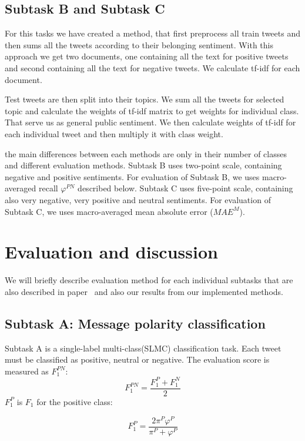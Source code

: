 \documentclass[runningheads,a4paper]{llncs}
\begin{document}
\subsection{Subtask B and Subtask C}
For this tasks we have created a method, that first preprocess all train tweets and then sums all the tweets according to their belonging sentiment. With this approach we get two documents, one containing all the text for positive tweets and second containing all the text for negative tweets. We calculate tf-idf for each document. 

Test tweets are then split into their topics. We sum all the tweets for selected topic and calculate the weights of tf-idf matrix to get weights for individual class. That serve us as general public sentiment. We then calculate weights of tf-idf for each individual tweet and then multiply it with class weight. 

the main differences between each methods are only in their number of classes and different evaluation methods. Subtask B uses two-point scale, containing negative and positive sentiments. For evaluation of Subtask B, we uses macro-averaged recall $\varphi^{PN}$ described below.  Subtask C uses five-point scale, containing also very negative, very positive and neutral sentiments. For evaluation of Subtask C, we uses macro-averaged mean absolute error ($MAE^M$).

\section{Evaluation and discussion}

We will briefly describe evaluation method for each individual subtasks that are also described in paper~\cite{nakov2016semeval} and also our results from our implemented methods.

\subsection{Subtask A: Message polarity classification}
Subtask A is a single-label multi-class(SLMC) classification task. Each tweet must be classified as positive, neutral or negative. The evaluation score is measured as $F^{PN}_1$:
\begin{equation}
F^{PN}_1 = \frac{F^P_1 + F^N_1}{2}
\end{equation}
$F_1^P$ is $F_1$ for the positive class:

\begin{equation}
F^{P}_1 = \frac{2\pi^P\varphi^P}{\pi^P + \varphi^P}
\end{equation}
\end{document}
